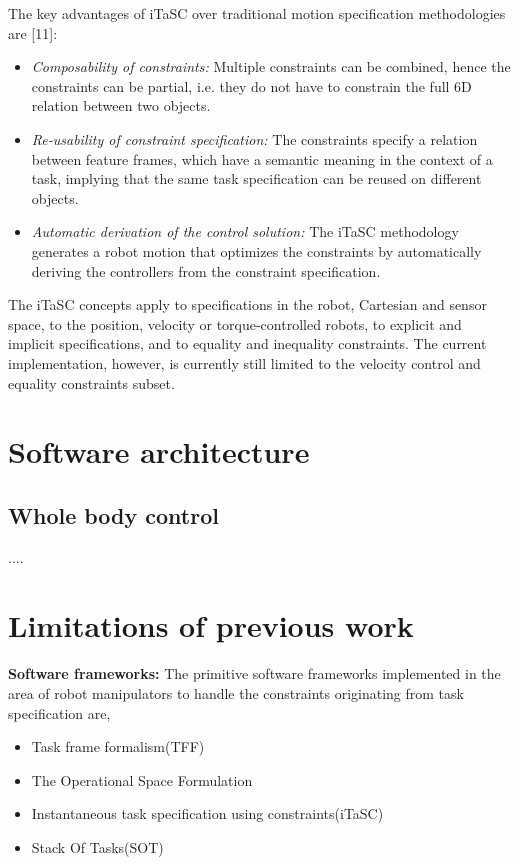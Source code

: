 The key advantages of iTaSC over traditional motion specification methodologies are [11]:
\begin{itemize}
	\item \textit{Composability of constraints: }Multiple constraints can be combined, hence the constraints can be partial, i.e. they do not have to constrain the full 6D relation between two objects.
	\item \textit{Re-usability of constraint specification:} The constraints specify a relation between feature frames, which have a semantic meaning in the context of a task, implying that the same task specification can be reused on different objects.
	\item \textit{Automatic derivation of the control solution:} The iTaSC methodology generates a robot motion that optimizes the constraints by automatically deriving the controllers from the constraint specification.
\end{itemize}
The iTaSC concepts apply to specifications in the robot, Cartesian and sensor space, to the position, velocity or torque-controlled robots, to explicit and implicit specifications, and to equality and inequality constraints. The current implementation, however, is currently still limited to the velocity control and equality constraints subset.

\section{Software architecture}
\subsection{Whole body control}{....}

\section{Limitations of previous work}

\textbf{Software frameworks: }The primitive software frameworks implemented in the area of robot manipulators to handle the constraints originating from task specification are,
\begin{itemize}
\item Task frame formalism(TFF)
\item The Operational Space Formulation
\item Instantaneous task specification using constraints(iTaSC)
\item Stack Of Tasks(SOT)
\end{itemize}


